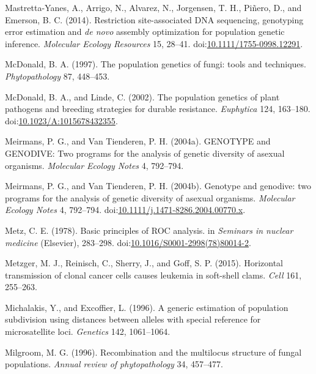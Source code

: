\documentclass[double,12pt]{beavtex}
\begin{document}
  \hypertarget{ref-mastretta2015restriction}{}
  Mastretta-Yanes, A., Arrigo, N., Alvarez, N., Jorgensen, T. H., Piñero,
  D., and Emerson, B. C. (2014). Restriction site-associated DNA
  sequencing, genotyping error estimation and \emph{de novo} assembly
  optimization for population genetic inference. \emph{Molecular Ecology
  Resources} 15, 28--41.
  doi:\href{https://doi.org/10.1111/1755-0998.12291}{10.1111/1755-0998.12291}.
  
  \hypertarget{ref-mcdonald1997population}{}
  McDonald, B. A. (1997). The population genetics of fungi: tools and
  techniques. \emph{Phytopathology} 87, 448--453.
  
  \hypertarget{ref-Mcdonald2002}{}
  McDonald, B. A., and Linde, C. (2002). The population genetics of plant
  pathogens and breeding strategies for durable resistance.
  \emph{Euphytica} 124, 163--180.
  doi:\href{https://doi.org/10.1023/A:1015678432355}{10.1023/A:1015678432355}.
  
  \hypertarget{ref-meirmans2004genotype}{}
  Meirmans, P. G., and Van Tienderen, P. H. (2004a). GENOTYPE and
  GENODIVE: Two programs for the analysis of genetic diversity of asexual
  organisms. \emph{Molecular Ecology Notes} 4, 792--794.
  
  \hypertarget{ref-genodive}{}
  Meirmans, P. G., and Van Tienderen, P. H. (2004b). Genotype and
  genodive: two programs for the analysis of genetic diversity of asexual
  organisms. \emph{Molecular Ecology Notes} 4, 792--794.
  doi:\href{https://doi.org/10.1111/j.1471-8286.2004.00770.x}{10.1111/j.1471-8286.2004.00770.x}.
  
  \hypertarget{ref-metz1978basic}{}
  Metz, C. E. (1978). Basic principles of ROC analysis. in \emph{Seminars
  in nuclear medicine} (Elsevier), 283--298.
  doi:\href{https://doi.org/10.1016/S0001-2998(78)80014-2}{10.1016/S0001-2998(78)80014-2}.
  
  \hypertarget{ref-metzger2015horizontal}{}
  Metzger, M. J., Reinisch, C., Sherry, J., and Goff, S. P. (2015).
  Horizontal transmission of clonal cancer cells causes leukemia in
  soft-shell clams. \emph{Cell} 161, 255--263.
  
  \hypertarget{ref-michalakis1996generic}{}
  Michalakis, Y., and Excoffier, L. (1996). A generic estimation of
  population subdivision using distances between alleles with special
  reference for microsatellite loci. \emph{Genetics} 142, 1061--1064.
  
  \hypertarget{ref-milgroom1996recombination}{}
  Milgroom, M. G. (1996). Recombination and the multilocus structure of
  fungal populations. \emph{Annual review of phytopathology} 34, 457--477.
  
\end{document}
